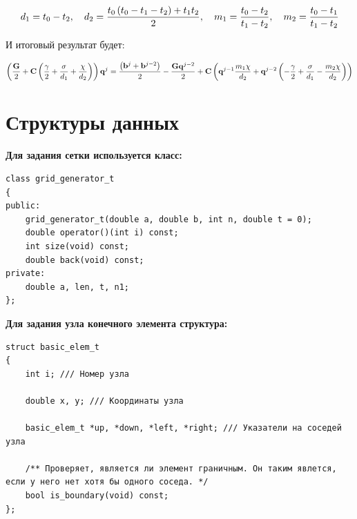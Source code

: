 $$ d_1 = t_0-t_2, \quad d_2 = \frac{t_0\left(t_0-t_1-t_2\right) + t_1 t_2}{2}, \quad m_1 = \frac{t_0-t_2}{t_1-t_2}, \quad m_2 = \frac{t_0-t_1}{t_1-t_2} $$ 

И итоговый результат будет:

$$ \left(\frac{\mathbf{G}}{2} + \mathbf{C}\left(\frac{\gamma}{2} + \frac{\sigma}{d_1} + \frac{\chi}{d_2}\right)\right)\mathbf{q}^j = \frac{\left(\mathbf{b}^j+\mathbf{b}^{j-2}\right)}{2} - \frac{\mathbf{G}\mathbf{q}^{j-2}}{2} + \mathbf{C}\left(\mathbf{q}^{j-1}\frac{m_1\chi}{d_2} + \mathbf{q}^{j-2}\left(-\frac{\gamma}{2}+\frac{\sigma}{d_1}-\frac{m_2\chi}{d_2}\right)\right) $$

\section{Структуры данных}

\noindent\textbf{Для задания сетки используется класс:}

\begin{tcolorbox}[
	colback=white,
	colframe=black!30!white,
	boxrule=0.5pt, 
	listing only,
	left=-0.5mm,
	leftrule=4mm,
	arc=2mm, outer arc=2mm,
	top=0pt,
	bottom=0pt,
	enhanced jigsaw,
	coltitle=black, 
	fonttitle=\bfseries\ttfamily,
	break at=-\baselineskip/0pt/\textheight, 
]
\begin{verbatim}
class grid_generator_t
{
public:
	grid_generator_t(double a, double b, int n, double t = 0);
	double operator()(int i) const;
	int size(void) const;
	double back(void) const;
private:
	double a, len, t, n1;
};
\end{verbatim}
\end{tcolorbox} 

\noindent\textbf{Для задания узла конечного элемента структура:}

\begin{tcolorbox}[
	colback=white,
	colframe=black!30!white,
	boxrule=0.5pt, 
	listing only,
	left=-0.5mm,
	leftrule=4mm,
	arc=2mm, outer arc=2mm,
	top=0pt,
	bottom=0pt,
	enhanced jigsaw,
	coltitle=black, 
	fonttitle=\bfseries\ttfamily,
	break at=-\baselineskip/0pt/\textheight, 
]
\begin{verbatim}
struct basic_elem_t
{
	int i; /// Номер узла

	double x, y; /// Координаты узла

	basic_elem_t *up, *down, *left, *right; /// Указатели на соседей узла

	/** Проверяет, является ли элемент граничным. Он таким явлется, если у него нет хотя бы одного соседа. */
	bool is_boundary(void) const;
};
\end{verbatim}
\end{tcolorbox} 

